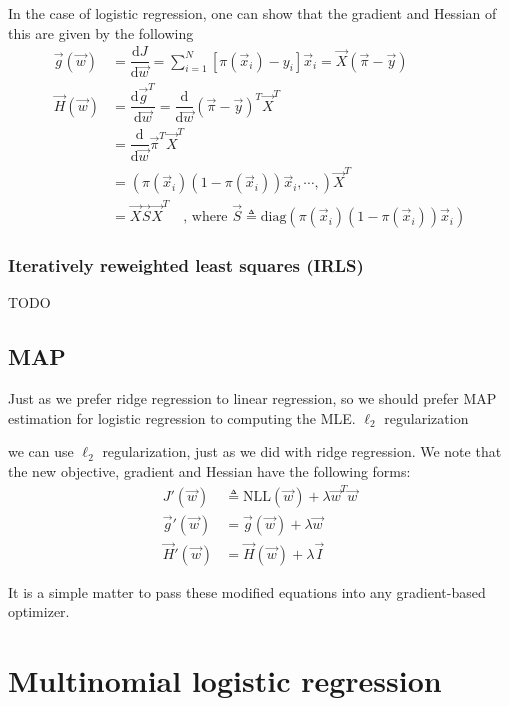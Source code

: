 In the case of logistic regression, one can show that the gradient and Hessian of this are given by the following
\begin{align}
\vec{g}(\vec{w}) &= \dfrac{\mathrm{d} J}{\mathrm{d} \vec{w}} = \sum\limits_{i=1}^N \left[\pi(\vec{x}_i) - y_i \right]\vec{x}_i = \vec{X}(\vec{\pi}-\vec{y})\\
\vec{H}(\vec{w}) &= \dfrac{\mathrm{d} \vec{g}^T}{\mathrm{d} \vec{w}}= \dfrac{\mathrm{d}}{\mathrm{d} \vec{w}} (\vec{\pi}-\vec{y})^T\vec{X}^T \nonumber \\
        &= \dfrac{\mathrm{d}}{\mathrm{d} \vec{w}} \vec{\pi}^T\vec{X}^T \nonumber \\
		&= (\pi(\vec{x}_i)(1-\pi(\vec{x}_i))\vec{x}_i, \cdots,)\vec{X}^T \nonumber \\
		&= \vec{X}\vec{S}\vec{X}^T \quad \text{, where } \vec{S} \triangleq \mathrm{diag}(\pi(\vec{x}_i)(1-\pi(\vec{x}_i))\vec{x}_i)
\end{align}


\subsubsection{Iteratively reweighted least squares (IRLS)}
\label{sec:IRLS}
TODO


\subsection{MAP}
Just as we prefer ridge regression to linear regression, so we should prefer MAP estimation for logistic regression to computing the MLE. 
$\ell_2$ regularization

we can use $\ell_2$ regularization, just as we did with ridge regression. We note that the new objective, gradient and Hessian have the following forms:
\begin{align}
J'(\vec{w}) & \triangleq \mathrm{NLL}(\vec{w})+\lambda \vec{w}^T\vec{w} \\
\vec{g}'(\vec{w}) &= \vec{g}(\vec{w})+\lambda\vec{w} \\
\vec{H}'(\vec{w}) &= \vec{H}(\vec{w})+\lambda\vec{I}
\end{align}

It is a simple matter to pass these modified equations into any gradient-based optimizer.


\section{Multinomial logistic regression}


